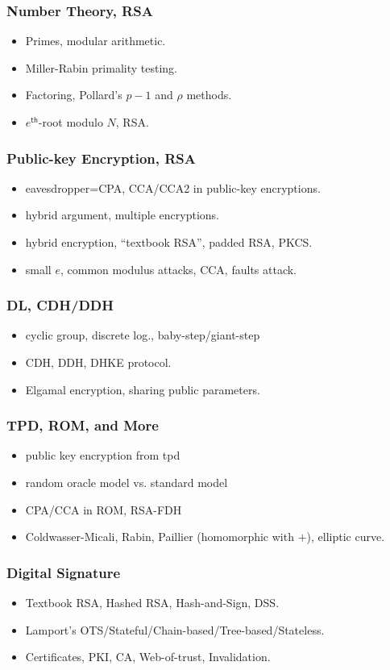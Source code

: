 \begin{frame}\frametitle{Number Theory, RSA}
\begin{itemize}
\item Primes, modular arithmetic.
\item Miller-Rabin primality testing.
\item Factoring, Pollard's $p-1$ and $\rho$ methods.
\item $e^{\mathsf{th}}$-root modulo $N$, RSA.
\end{itemize}
\end{frame}
\begin{frame}\frametitle{Public-key Encryption, RSA}
\begin{itemize}
\item eavesdropper=CPA, CCA/CCA2 in public-key encryptions.
\item hybrid argument, multiple encryptions.
\item hybrid encryption, ``textbook RSA'', padded RSA, PKCS.
\item small $e$, common modulus attacks, CCA, faults attack.
\end{itemize}
\end{frame}
\begin{frame}\frametitle{DL, CDH/DDH}
\begin{itemize}
\item cyclic group, discrete log., baby-step/giant-step
\item CDH, DDH, DHKE protocol.
\item Elgamal encryption, sharing public parameters.
\end{itemize}
\end{frame}
\begin{frame}\frametitle{TPD, ROM, and More}
\begin{itemize}
\item public key encryption from tpd
\item random oracle model vs. standard model
\item CPA/CCA in ROM, RSA-FDH
\item Coldwasser-Micali, Rabin, Paillier (homomorphic with $+$), elliptic curve.
\end{itemize}
\end{frame}
\begin{frame}\frametitle{Digital Signature}
\begin{itemize}
\item Textbook RSA, Hashed RSA, Hash-and-Sign, DSS.
\item Lamport's OTS/Stateful/Chain-based/Tree-based/Stateless.
\item Certificates, PKI, CA, Web-of-trust, Invalidation.
\end{itemize}
\end{frame}
